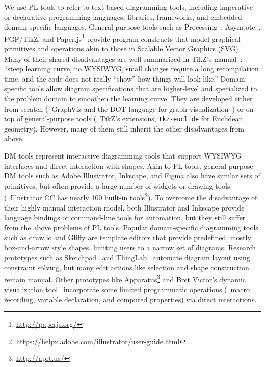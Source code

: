 We use PL tools to refer to text-based diagramming tools, including imperative or declarative programming languages, libraries, frameworks, and embedded domain-specific languages. General-purpose tools such as Processing~\cite{Reas:2006:PPM}, Asymtote~\cite{Bowman:2008:AVG}, PGF/TikZ, and Paper.js\footnote{\url{http://paperjs.org/}} provide program constructs that model graphical primitives and operations akin to those in Scalable Vector Graphics (SVG)~\cite{SVGStandard}. Many of their shared disadvantages are well summarized in TikZ's manual~\cite{TikZ-Manual}: ``steep learning curve, no WYSIWYG, small changes require a long recompilation time, and the code does not really ``show'' how things will look like.'' Domain-specific tools allow diagram specifications that are higher-level and specialized to the problem domain to smoothen the learning curve. They are developed either from scratch (\eg~GraphViz and the DOT language for graph visualization~\cite{Graphviz}) or on top of general-purpose tools (\eg~TikZ's extensions, \texttt{tkz-euclide} for Euclidean geometry). However, many of them still inherit the other disadvantages from above. 

DM tools represent interactive diagramming tools that support WYSIWYG interfaces and direct interaction with shapes. Akin to PL tools, general-purpose DM tools such as Adobe Illustrator, Inkscape, and Figma also have similar sets of primitives, but often provide a large number of widgets or drawing tools (\eg~Illustrator CC has nearly 100 built-in tools\footnote{\url{https://helpx.adobe.com/illustrator/user-guide.html}}). To overcome the disadvantage of their highly manual interaction model, both Illustrator and Inkscape provide language bindings or command-line tools for automation, but they still suffer from the above problems of PL tools. Popular domain-specific diagramming tools such as draw.io and Gliffy are template editors that provide predefined, mostly box-and-arrow style shapes, limiting users to a narrow set of diagrams. Research prototypes such as Sketchpad~\cite{sketchpad} and ThingLab~\cite{thinglab} automate diagram layout using constraint solving, but many edit actions like selection and shape construction remain manual. Other prototypes like Apparatus\footnote{\url{http://aprt.us/}} and Bret Victor's dynamic visualization tool~\cite{dynamicViz} incorporate some limited programmatic operations (\eg~macro recording, variable declaration, and computed properties) via direct interactions. 


